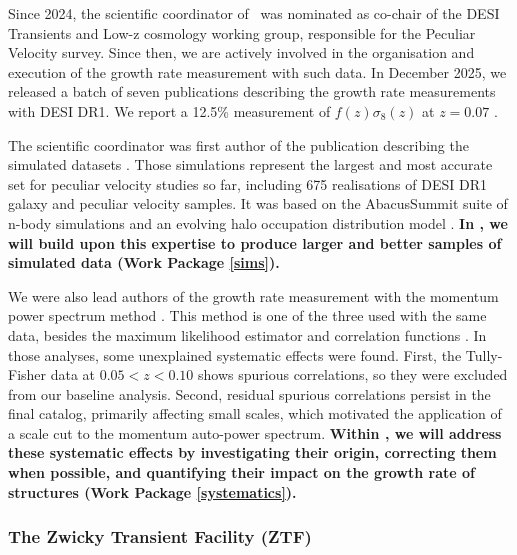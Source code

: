   Since 2024, the scientific coordinator of \projacro\ was nominated 
  as co-chair of the DESI Transients and Low-z cosmology working group, 
  responsible for the Peculiar Velocity survey. Since then, we are 
  actively involved in the organisation and execution of the growth 
  rate measurement with such data. 
  In December 2025, we released a batch of seven publications 
  describing the growth rate measurements with DESI DR1. 
  We report a 12.5\% measurement of $f(z) \sigma_8(z)$ at $z=0.07$ 
  \cite{bautistaDESIDR1Peculiar2025,
  douglassDESIDR1Peculiar2025,
  carrDESIDR1Peculiar2025,
  qinDESIDR1Peculiar2025,
  rossDESIDR1Peculiar2025,
  turnerDESIDR1Peculiar2025}. 
  
  The scientific coordinator was first author of the publication 
  describing the simulated datasets \cite{bautistaDESIDR1Peculiar2025}. 
  Those simulations represent the largest and most accurate set  
  for peculiar velocity studies so far, including 675 realisations 
  of DESI DR1 galaxy and peculiar velocity samples. It was based 
  on the AbacusSummit suite of n-body simulations 
  \cite{maksimovaABACUSSUMMITMassiveSet2021} and 
  an evolving halo occupation distribution model
  \cite{smithGeneratingMockGalaxy2024}.
  \textbf{In \projacro, we will build upon this expertise to produce larger and 
  better samples of simulated data (Work Package \ref{sims}).}

  We were also lead authors of the growth rate measurement with 
  the momentum power spectrum method 
  \cite{qinDESIDR1Peculiar2025}.
  This method is one of the three used with the same data, besides 
  the maximum likelihood estimator \cite{laiDESIDR1Peculiar2025}
  and correlation functions \cite{turnerDESIDR1Peculiar2025}. 
  In those analyses, some unexplained systematic effects were found.
  First, the Tully-Fisher data 
  at $0.05< z <0.10$ shows spurious correlations, so they were 
  excluded from our baseline analysis. 
  Second, residual spurious correlations persist in the final catalog, 
  primarily affecting small scales, which motivated the application 
  of a scale cut to the momentum auto-power spectrum.
  \textbf{Within \projacro, we will address these systematic effects 
  by investigating their origin, correcting them when possible, 
  and quantifying their impact on the growth rate of structures 
  (Work Package \ref{systematics}).}

  
\subsubsection*{The Zwicky Transient Facility (ZTF)}

